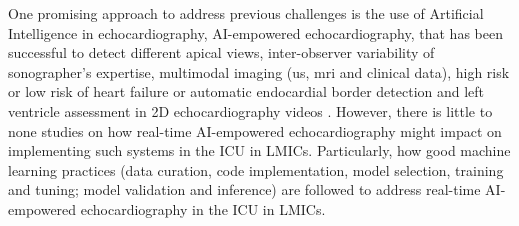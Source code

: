 \documentclass[mlabstract,twocolumn]{jmlr}
\begin{document}
One promising approach to address previous challenges is the use of Artificial Intelligence in echocardiography, AI-empowered echocardiography, that has been successful to detect different apical views, inter-observer variability of sonographer's expertise, multimodal imaging (us, mri and clinical data), high risk or low risk of heart failure or automatic endocardial border detection and left ventricle assessment in 2D echocardiography videos \citep{tromp2022, zhang2022-mdpi, behnami2020, ono2022}.
However, there is little to none studies on how real-time AI-empowered echocardiography might impact on implementing such systems in the ICU in LMICs.
Particularly, how good machine learning practices (data curation, code implementation, model selection, training and tuning; model validation and inference) are followed to address real-time AI-empowered echocardiography in the ICU in LMICs.



\end{document}

